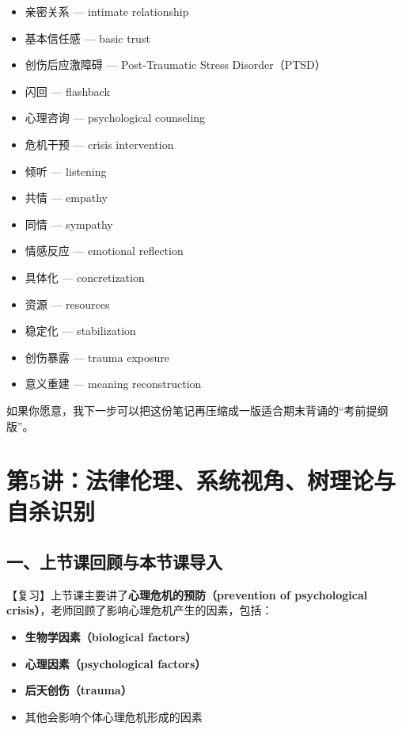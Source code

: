 \documentclass[
  chinese,
  9pt,
  a4paper,
]{ctexart}
\providecommand{\tightlist}{%
  \setlength{\itemsep}{0pt}\setlength{\parskip}{0pt}}
\begin{document}
\begin{itemize}
  紊乱型依恋 --- disorganized attachment
\item
  亲密关系 --- intimate relationship
\item
  基本信任感 --- basic trust
\item
  创伤后应激障碍 --- Post-Traumatic Stress Disorder（PTSD）
\item
  闪回 --- flashback
\item
  心理咨询 --- psychological counseling
\item
  危机干预 --- crisis intervention
\item
  倾听 --- listening
\item
  共情 --- empathy
\item
  同情 --- sympathy
\item
  情感反应 --- emotional reflection
\item
  具体化 --- concretization
\item
  资源 --- resources
\item
  稳定化 --- stabilization
\item
  创伤暴露 --- trauma exposure
\item
  意义重建 --- meaning reconstruction
\end{itemize}

如果你愿意，我下一步可以把这份笔记再压缩成一版适合期末背诵的``考前提纲版''。

\clearpage

\section{第5讲：法律伦理、系统视角、树理论与自杀识别}\label{ux7b2c5ux8bb2ux6cd5ux5f8bux4f26ux7406ux7cfbux7edfux89c6ux89d2ux6811ux7406ux8bbaux4e0eux81eaux6740ux8bc6ux522b}

\subsection{一、上节课回顾与本节课导入}\label{ux4e00ux4e0aux8282ux8bfeux56deux987eux4e0eux672cux8282ux8bfeux5bfcux5165}

【复习】上节课主要讲了\textbf{心理危机的预防（prevention of
psychological crisis）}，老师回顾了影响心理危机产生的因素，包括：

\begin{itemize}
\tightlist
\item
  \textbf{生物学因素（biological factors）}
\item
  \textbf{心理因素（psychological factors）}
\item
  \textbf{后天创伤（trauma）}
\item
  其他会影响个体心理危机形成的因素
\end{itemize}
\end{document}
